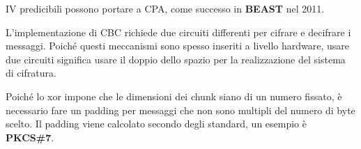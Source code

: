 \begin{remark}
IV predicibili possono portare a CPA, come successo in \textbf{BEAST} nel 2011.
\end{remark}
\begin{note}
L'implementazione di CBC richiede due circuiti differenti per cifrare e decifrare i messaggi. Poiché questi meccanismi sono spesso inseriti a livello hardware, usare due circuiti significa usare il doppio dello spazio per la realizzazione del sistema di cifratura.
\end{note}
\begin{note}
Poiché lo xor impone che le dimensioni dei chunk siano di un numero fissato, è necessario fare un padding per messaggi che non sono multipli del numero di byte scelto. Il padding viene calcolato secondo degli standard, un esempio è \textbf{PKCS\#7}.
\end{note}
